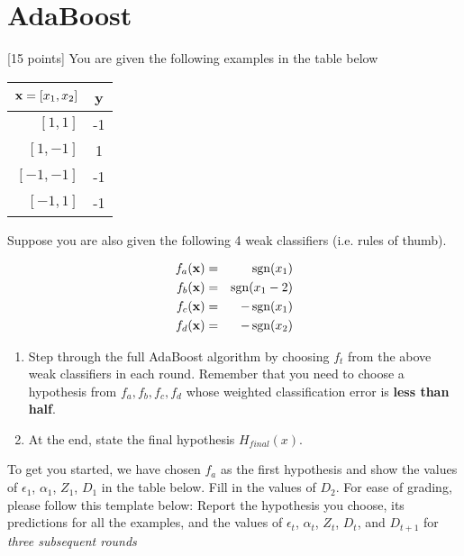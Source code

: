 \section{AdaBoost }

[15 points] You are given the following examples in the table below
\begin{center}

\begin{tabular}{rc}
  \toprule
  ${\bf x} = [x_1,x_2]$ & y             \\ \midrule
  $[1,1]$                 & -1            \\ 
  $[1,-1]$                & 1             \\ 
  $[-1,-1]$               & -1            \\ 
  $[-1,1]$                & -1            \\ \bottomrule
\end{tabular}
\end{center}

Suppose you are also given the following 4 weak classifiers
(i.e. rules of thumb).

\begin{eqnarray*}
  f_a({\bf x}) & = & \operatorname{sgn}(x_1)   \\
  f_b({\bf x}) & = & \operatorname{sgn}(x_1-2) \\
  f_c({\bf x}) & = & -\operatorname{sgn}(x_1)  \\
  f_d({\bf x}) & = & -\operatorname{sgn}(x_2)  \\
\end{eqnarray*}

\begin{enumerate}
\item Step through the full AdaBoost algorithm by choosing $f_t$
  from the above weak classifiers in each round.  Remember that you
  need to choose a hypothesis from $f_a, f_b, f_c, f_d$ whose
  weighted classification error is {\bf less than half}.

\item At the end, state the final hypothesis $H_{final}(x)$.
\end{enumerate}


To get you started, we have chosen $f_a$ as the first hypothesis and
show the values of $\epsilon_1$, $\alpha_1$, $Z_1$, $D_1$ in the
table below. Fill in the values of $D_2$.  For ease of grading,
please follow this template below: Report the hypothesis you choose,
its predictions for all the examples, and the values of
$\epsilon_t$, $\alpha_t$, $Z_t$, $D_t$, and $D_{t+1}$ for {\em three
  subsequent rounds}

